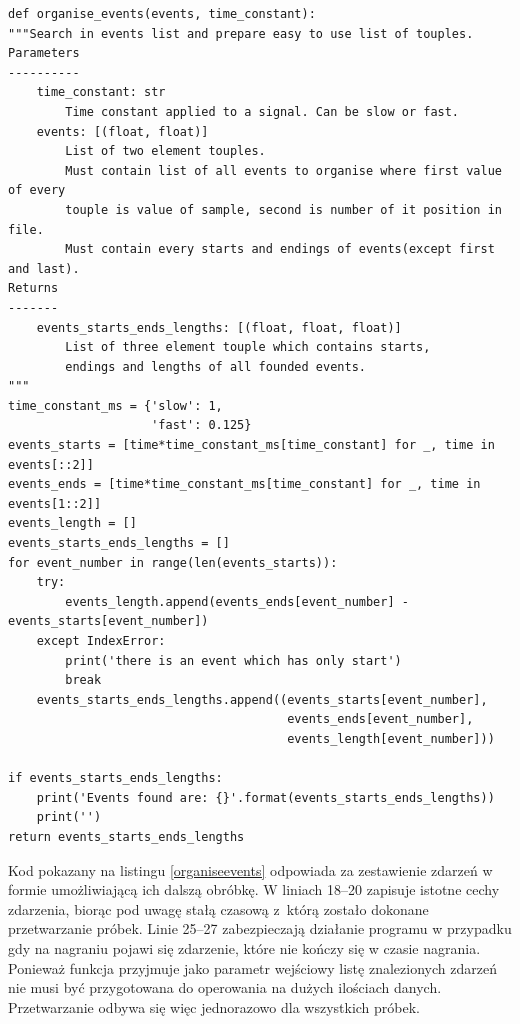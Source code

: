 \documentclass[eng,printmode]{mgr}
\begin{document}
\begin{minipage}{\linewidth}
\begin{lstlisting}[caption={Fragment kodu źródłowego pliku Detectors.py, klasa EventsOrganiser,\newline metoda organise\_events},captionpos=b,label={organiseevents}]  
    def organise_events(events, time_constant):
"""Search in events list and prepare easy to use list of touples.
Parameters
----------
    time_constant: str
        Time constant applied to a signal. Can be slow or fast.
    events: [(float, float)]
        List of two element touples.
        Must contain list of all events to organise where first value of every
        touple is value of sample, second is number of it position in file.
        Must contain every starts and endings of events(except first and last).
Returns
-------
    events_starts_ends_lengths: [(float, float, float)]
        List of three element touple which contains starts,
        endings and lengths of all founded events.
"""
time_constant_ms = {'slow': 1,
                    'fast': 0.125}
events_starts = [time*time_constant_ms[time_constant] for _, time in events[::2]]
events_ends = [time*time_constant_ms[time_constant] for _, time in events[1::2]]
events_length = []
events_starts_ends_lengths = []
for event_number in range(len(events_starts)):
    try:
        events_length.append(events_ends[event_number] - events_starts[event_number])
    except IndexError:
        print('there is an event which has only start')
        break
    events_starts_ends_lengths.append((events_starts[event_number],
                                       events_ends[event_number],
                                       events_length[event_number]))

if events_starts_ends_lengths:
    print('Events found are: {}'.format(events_starts_ends_lengths))
    print('')
return events_starts_ends_lengths
\end{lstlisting}
\end{minipage}

Kod pokazany na listingu \ref{organiseevents} odpowiada za zestawienie zdarzeń w formie umożliwiającą ich dalszą obróbkę. W liniach 18--20 zapisuje istotne cechy zdarzenia, biorąc pod uwagę stałą czasową  z~którą zostało dokonane przetwarzanie próbek. Linie 25--27 zabezpieczają działanie programu w przypadku gdy na nagraniu pojawi się zdarzenie, które nie kończy się w czasie nagrania. Ponieważ funkcja przyjmuje jako parametr wejściowy listę znalezionych zdarzeń nie musi być przygotowana do operowania na dużych ilościach danych. Przetwarzanie odbywa się więc jednorazowo dla wszystkich próbek. 
\end{document}
